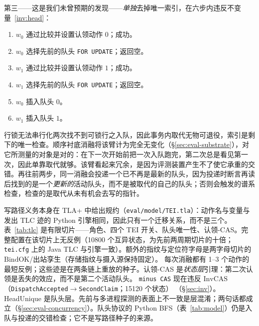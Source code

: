 \documentclass[acmsmall,manuscript,review,anonymous]{acmart}
\renewcommand{\_}{\discretionary{\textunderscore}{}{\textunderscore}}
\begin{document}
第三——这是我们未曾预期的发现——\emph{单独}去掉唯一索引，在六步内违反不变量~\ref{inv:head}：

\begin{enumerate}\itemsep1pt
\item $w_0$ 通过比较并设置认领动作 $0$；成功。
\item $w_0$ 选择先前的队头 \texttt{FOR UPDATE}；返回空。
\item $w_1$ 通过比较并设置认领动作 $1$；成功。
\item $w_1$ 选择先前的队头 \texttt{FOR UPDATE}；返回空。
\item $w_0$ 插入队头 $0$。
\item $w_1$ 插入队头 $1$。
\end{enumerate}

行锁无法串行化两次找不到可锁行之入队，因此事务内取代无物可退役，索引是剩下的唯一检查。顺序衬底消融将该臂计为完全无变化（\S\ref{sec:eval-substrate}），对它所测量的对象是对的：在下一次开始前把一次入队跑完，第二次总是看见第一次，因此单靠取代就够。该臂看起来冗余，是因为评测装置产生不了使它承重的交错。再往前两步，同一消融会投递一个已不再是最新的队头，因为投递时断言再读后找到的是一个\emph{更新的}活动队头，而不是被取代的自己的队头；否则会触发的谱系检查，检查的是取代从未有机会去写的指针。

写路径义务本身在 {TLA+} 中给出规约（\texttt{eval/model/TEI.tla}）：动作名与变量与发出 {TLC} 迹的 {Python} 引擎相同，因此只有一个迁移关系，而不是三个。表~\ref{tab:tlc} 是有限切片——角色、四个 {TEI} 开关、队头唯一性、认领-{CAS}。完整配置在该切片上无反例（10800 个互异状态，为先前两周期切片的十倍；\texttt{tei.cfg} 上的 {Java} {TLC} 与引擎一致）。额外的指纹与定位符字母是两字母切片的 $\mathrm{BindOK}$/出站孪生（存储指纹与摄入源保持固定）。
每次消融都有 1--3 个动作的最短反例；这些迹是在两条链上重放的种子。认领-{CAS} 是\emph{状态层}引理：第二次认领是丢失的效应，而不是第二个活动队头。
\texttt{minus CAS} 现在违反 $\mathrm{InvCAS}$
（\texttt{DispatchAccepted}$\to$\texttt{SecondClaim}；15120 个状态）
（\S\ref{sec:inv}）。
{HeadUnique} 是队头层。先前与多进程探测的表面上不一致是层混淆；两句话都成立（\S\ref{sec:eval-concurrency}）。队头协议的 {Python} {BFS}（表~\ref{tab:model}）仍是入队与投递的交错检查；它不是写路径种子的来源。
\end{document}
